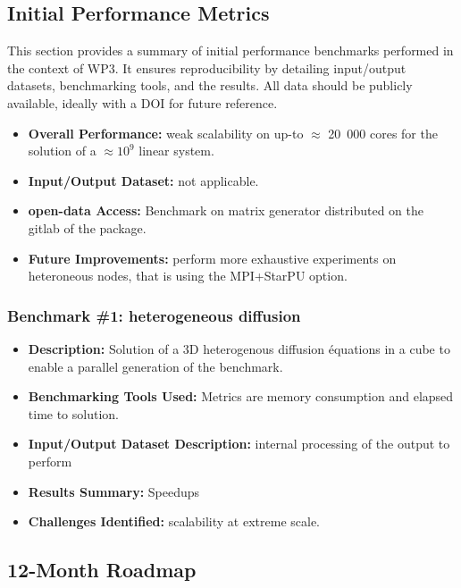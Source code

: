 \subsection{Initial Performance Metrics}
\label{sec:WP3:Composyx:metrics}

This section provides a summary of initial performance benchmarks performed in the context of WP3. It ensures reproducibility by detailing input/output datasets, benchmarking tools, and the results. All data should be publicly available, ideally with a DOI for future reference.

\begin{itemize}
    \item \textbf{Overall Performance:} weak scalability on up-to $\approx$ 20~000 cores for the solution of a $\approx 10^9$ linear system. 
    \item \textbf{Input/Output Dataset:} not applicable.
    \item \textbf{open-data Access:} Benchmark on matrix generator distributed on the gitlab of the package.
    \item \textbf{Future Improvements:} perform more exhaustive experiments on heteroneous nodes, that is using the MPI+StarPU option.
\end{itemize}

\subsubsection{Benchmark \#1: heterogeneous diffusion }
\begin{itemize}
    \item \textbf{Description:} Solution of a 3D heterogenous diffusion équations in a cube to enable a parallel generation of the benchmark.
    \item \textbf{Benchmarking Tools Used:} Metrics are memory consumption and elapsed time to solution.
    \item \textbf{Input/Output Dataset Description:} internal processing of the output to perform 
    \item \textbf{Results Summary:} Speedups
    \item \textbf{Challenges Identified:} scalability at extreme scale.
\end{itemize}

\subsection{12-Month Roadmap}
\label{sec:WP3:Composyx:roadmap}

